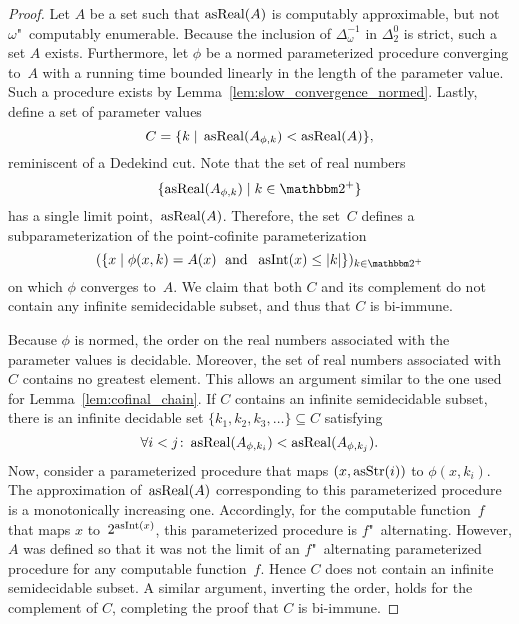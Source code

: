 \begin{proof}
  Let $A$ be a set such that $\operatorname{asReal}(A)$ is computably approximable, but not $\omega$"~computably enumerable.
  Because the inclusion of $\Delta^{-1}_\omega$ in $\Delta^0_2$ is strict, such a set $A$ exists.
  Furthermore, let $\phi$ be a normed parameterized procedure converging to~$A$ with a running time bounded linearly in the length of the parameter value.
  Such a procedure exists by Lemma~\ref{lem:slow_convergence_normed}.
  Lastly, define a set of parameter values
  \begin{equation*}
    C = \{k \;|\; \operatorname{asReal}(A_{\phi,k}) < \operatorname{asReal}(A)\},
  \end{equation*}
  reminiscent of a Dedekind cut.
  Note that the set of real numbers
  \begin{equation*}
    \{\asReal(A_{\phi, k}) \st k \in \binary^+\}
  \end{equation*}
  has a single limit point,~$\operatorname{asReal}(A)$.
  Therefore, the set~$C$ defines a subparameterization of the point-cofinite parameterization
  \begin{equation*}
    (\{x \st \phi(x, k) = A(x) \reland \asNat(x) \le \length{k}\})_{k \in \binary^+}
  \end{equation*}
  on which $\phi$ converges to~$A$.
  We claim that both $C$ and its complement do not contain any infinite semidecidable subset, and thus that $C$ is bi-immune.

  Because $\phi$ is normed, the order on the real numbers associated with the parameter values is decidable.
  Moreover, the set of real numbers associated with $C$ contains no greatest element.
  This allows an argument similar to the one used for Lemma~\ref{lem:cofinal_chain}.
  If $C$ contains an infinite semidecidable subset, there is an infinite decidable set $\{k_1, k_2, k_3, \ldots\} \subseteq C$ satisfying
  \begin{equation*}
    \forall i < j\colon \operatorname{asReal}(A_{\phi, k_i}) < \operatorname{asReal}(A_{\phi, k_j}).
  \end{equation*}
  Now, consider a parameterized procedure that maps $(x, \operatorname{asStr}(i))$ to $\phi(x, k_i)$.
  The approximation of~$\operatorname{asReal}(A)$ corresponding to this parameterized procedure is a monotonically increasing one.
  Accordingly, for the computable function~$f$ that maps $x$ to~$2^{\operatorname{asInt}(x)}$, this parameterized procedure is $f$"~alternating.
  However, $A$ was defined so that it was not the limit of an $f$"~alternating parameterized procedure for any computable function~$f$.
  Hence $C$ does not contain an infinite semidecidable subset.
  A similar argument, inverting the order, holds for the complement of $C$, completing the proof that $C$ is bi-immune.
\end{proof}

